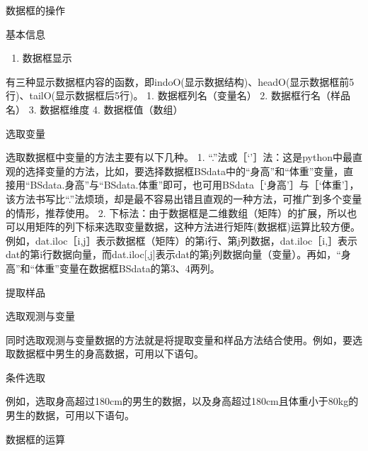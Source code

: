 \documentclass[ignorenonframetext,11pt,xcolor=dvipsnames,aspectratio=1610,hyperref={bookmarksdepth=4}]{beamer}
\providecommand{\tightlist}{%
  \setlength{\itemsep}{0pt}\setlength{\parskip}{0pt}}
\begin{document}
\begin{frame}{数据框的操作}
\protect\hypertarget{section-6}{}

\begin{block}{基本信息}

\begin{enumerate}
\tightlist
\item
  数据框显示
\end{enumerate}

有三种显示数据框内容的函数，即indoO(显示数据结构)、headO(显示数据框前5行)、tailO(显示数据框后5行)。
1. 数据框列名（变量名） 2. 数据框行名（样品名） 3. 数据框维度 4.
数据框值（数组）

\end{block}

\begin{block}{选取变量}

选取数据框中变量的方法主要有以下几种。 1.
``.''法或［`'］法：这是python中最直观的选择变量的方法，比如，要选择数据框BSdata中的``身高''和``体重''变量，直接用``BSdata.身高''与``BSdata.体重''即可，也可用BSdata［`身高'］与［`体重'］，该方法书写比``.''法烦琐，却是最不容易出错且直观的一种方法，可推广到多个变量的情形，推荐使用。
2.
下标法：由于数据框是二维数组（矩阵）的扩展，所以也可以用矩阵的列下标来选取变量数据，这种方法进行矩阵(数据框)运算比较方便。例如，dat.iloc［i,j］表示数据框（矩阵）的第i行、第j列数据，dat.iloc［i,］表示dat的第i行数据向量，而dat.iloc{[},j{]}表示dat的第j列数据向量（变量）。再如，``身高''和``体重''变量在数据框BSdata的第3、4两列。

\end{block}

\begin{block}{提取样品}

\end{block}

\begin{block}{选取观测与变量}

同时选取观测与变量数据的方法就是将提取变量和样品方法结合使用。例如，要选取数据框中男生的身高数据，可用以下语句。

\end{block}

\begin{block}{条件选取}

例如，选取身高超过180cm的男生的数据，以及身高超过180cm且体重小于80kg的男生的数据，可用以下语句。

\end{block}

\begin{block}{数据框的运算}


\end{block}
\end{frame}
\end{document}
